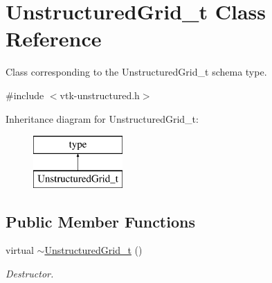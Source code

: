\hypertarget{classUnstructuredGrid__t}{\section{Unstructured\-Grid\-\_\-t Class Reference}
\label{classUnstructuredGrid__t}
}


Class corresponding to the Unstructured\-Grid\-\_\-t schema type.  




{\ttfamily \#include $<$vtk-\/unstructured.\-h$>$}

Inheritance diagram for Unstructured\-Grid\-\_\-t\-:\begin{figure}[H]
\begin{center}
\leavevmode
\includegraphics[height=2.000000cm]{classUnstructuredGrid__t}
\end{center}
\end{figure}
\subsection*{Public Member Functions}
\begin{DoxyCompactItemize}
\item 
virtual \hyperlink{classUnstructuredGrid__t_a6fb9239ab1215edd7e7822a66d3af53c}{$\sim$\-Unstructured\-Grid\-\_\-t} ()
\begin{DoxyCompactList}\small\item\em Destructor. \end{DoxyCompactList}\end{DoxyCompactItemize}
